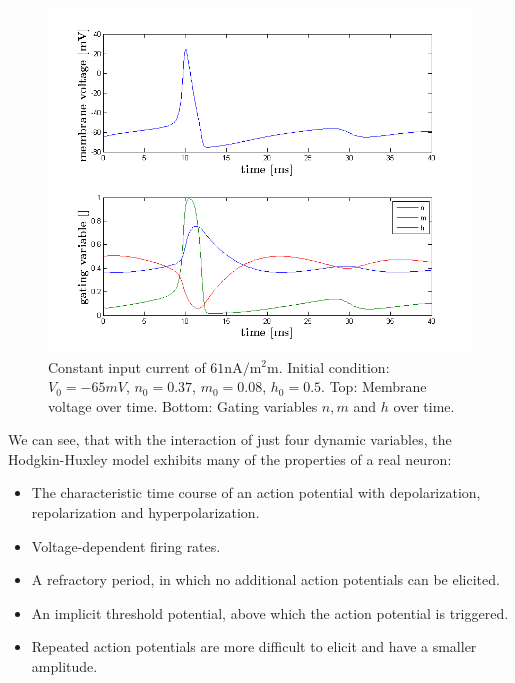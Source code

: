 \documentclass{scrartcl}
\begin{document}
\begin{figure}
\centering
\includegraphics[trim = {1.4cm 0.3 1.8cm 1cm}, height=0.35\textheight, clip]{../pics/med_minus}
\caption{Constant input current of $61 \si{\nano\ampere\per\square\milli\meter}$. Initial condition: $V_0 = -65\si{mV}$, $n_0 = 0.37$, $m_0 = 0.08$, $h_0 = 0.5$. Top: Membrane voltage over time. Bottom: Gating variables $n, m$ and $h$ over time.}
\label{med_minus}
\end{figure}

We can see, that with the interaction of just four dynamic variables, the Hodgkin-Huxley model exhibits many of the properties of a real neuron:
\begin{itemize}
\item The characteristic time course of an action potential with depolarization, repolarization and hyperpolarization.
\item Voltage-dependent firing rates.
\item A refractory period, in which no additional action potentials can be elicited.
\item An implicit threshold potential, above which the action potential is triggered.
\item Repeated action potentials are more difficult to elicit and have a smaller amplitude.
\end{itemize}
\end{document}
